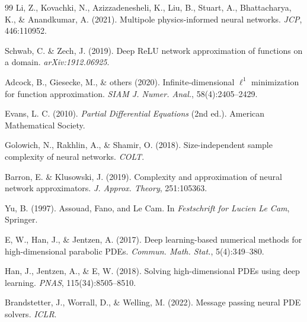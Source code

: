 \documentclass[12pt,a4paper]{article}
\begin{document}
\begin{thebibliography}{99}
     Li, Z., Kovachki, N., Azizzadenesheli, K., Liu, B., Stuart, A., Bhattacharya, K., \& Anandkumar, A. (2021). Multipole physics-informed neural networks. \textit{JCP}, 446:110952.

     Schwab, C. \& Zech, J. (2019). Deep ReLU network approximation of functions on a domain. \textit{arXiv:1912.06925}.

     Adcock, B., Giesecke, M., \& others (2020). Infinite-dimensional $\ell^1$ minimization for function approximation. \textit{SIAM J. Numer. Anal.}, 58(4):2405--2429.

     Evans, L. C. (2010). \textit{Partial Differential Equations} (2nd ed.). American Mathematical Society.

     Golowich, N., Rakhlin, A., \& Shamir, O. (2018). Size-independent sample complexity of neural networks. \textit{COLT}.

     Barron, E. \& Klusowski, J. (2019). Complexity and approximation of neural network approximators. \textit{J. Approx. Theory}, 251:105363.

     Yu, B. (1997). Assouad, Fano, and Le Cam. In \textit{Festschrift for Lucien Le Cam}, Springer.

     E, W., Han, J., \& Jentzen, A. (2017). Deep learning-based numerical methods for high-dimensional parabolic PDEs. \textit{Commun. Math. Stat.}, 5(4):349--380.

     Han, J., Jentzen, A., \& E, W. (2018). Solving high-dimensional PDEs using deep learning. \textit{PNAS}, 115(34):8505--8510.

     Brandstetter, J., Worrall, D., \& Welling, M. (2022). Message passing neural PDE solvers. \textit{ICLR}.
\end{thebibliography}
\end{document}

